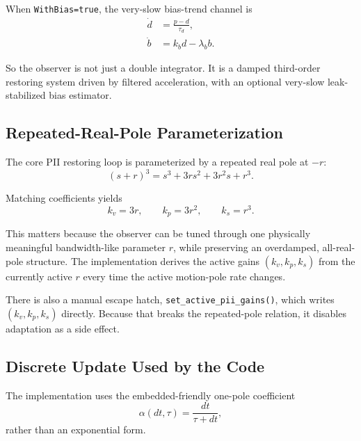 \documentclass[conference]{IEEEtran}
\begin{document}
    When \texttt{WithBias=true}, the very-slow bias-trend channel is
    \begin{align}
        \dot{d} &= \frac{p-d}{\tau_d}, \label{eq:ddot}\\
        \dot{b} &= k_b d - \lambda_b b. \label{eq:bdot}
    \end{align}

    So the observer is not just a double integrator. It is a damped
    third-order restoring system driven by filtered acceleration, with an
    optional very-slow leak-stabilized bias estimator.

    \subsection{Repeated-Real-Pole Parameterization}

    The core PII restoring loop is parameterized by a repeated real pole at
    \(-r\):
    \begin{equation}
    (s+r)^3 = s^3 + 3rs^2 + 3r^2 s + r^3.
    \end{equation}

    Matching coefficients yields
    \begin{equation}
        k_v = 3r,\qquad
        k_p = 3r^2,\qquad
        k_s = r^3.
    \end{equation}

    This matters because the observer can be tuned through one physically
    meaningful bandwidth-like parameter \(r\), while preserving an overdamped,
    all-real-pole structure. The implementation derives the active gains
    \((k_v,k_p,k_s)\) from the currently active \(r\) every time the active
    motion-pole rate changes.

    There is also a manual escape hatch, \texttt{set\_active\_pii\_gains()},
    which writes \((k_v,k_p,k_s)\) directly. Because that breaks the
    repeated-pole relation, it disables adaptation as a side effect.

    \subsection{Discrete Update Used by the Code}

    The implementation uses the embedded-friendly one-pole coefficient
    \begin{equation}
        \alpha(dt,\tau) = \frac{dt}{\tau + dt},
    \end{equation}
    rather than an exponential form.
\end{document}
